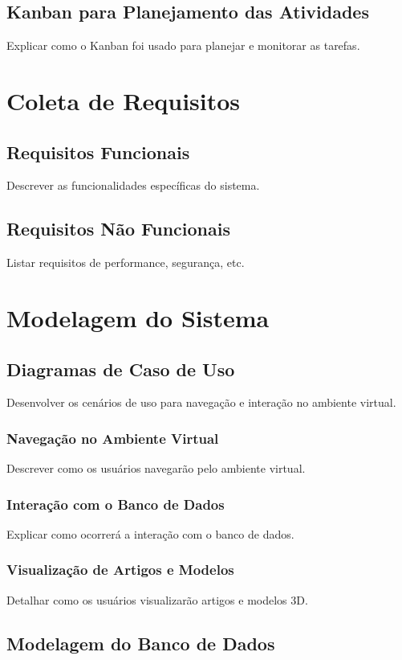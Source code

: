 \subsection{Kanban para Planejamento das Atividades}
Explicar como o Kanban foi usado para planejar e monitorar as tarefas.

\section{Coleta de Requisitos}
\subsection{Requisitos Funcionais}
Descrever as funcionalidades específicas do sistema.

\subsection{Requisitos Não Funcionais}
Listar requisitos de performance, segurança, etc.

\section{Modelagem do Sistema}
\subsection{Diagramas de Caso de Uso}
Desenvolver os cenários de uso para navegação e interação no ambiente virtual.

\subsubsection{Navegação no Ambiente Virtual}
Descrever como os usuários navegarão pelo ambiente virtual.

\subsubsection{Interação com o Banco de Dados}
Explicar como ocorrerá a interação com o banco de dados.

\subsubsection{Visualização de Artigos e Modelos}
Detalhar como os usuários visualizarão artigos e modelos 3D.

\subsection{Modelagem do Banco de Dados}
